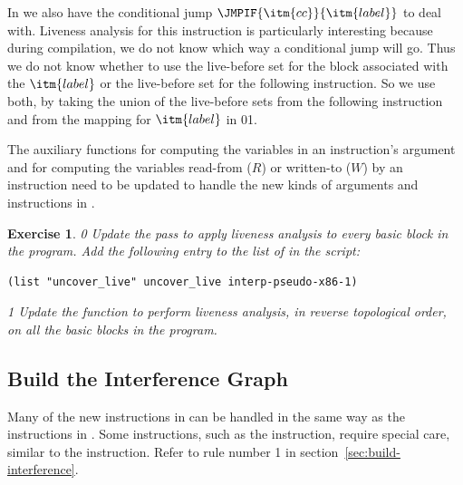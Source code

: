 \documentclass[7x10]{TimesAPriori_MIT}%
\def\racketEd{0}
\def\pythonEd{1}
\providecommand{\BookEdition}{1}
\let\edition\BookEdition
\newcommand{\racket}[1]{{\if\edition\racketEd{#1}\fi}}
\newcommand{\pythonColor}[0]{}
\newcommand{\python}[1]{{\if\edition\pythonEd\pythonColor #1\fi}}
\newtheorem{exercise}[theorem]{Exercise}
\numberwithin{theorem}{chapter}
\numberwithin{definition}{chapter}
\numberwithin{equation}{chapter}
\begin{document}
In \LangXIfVar{} we also have the conditional jump
$\JMPIF{\itm{cc}}{\itm{label}}$ to deal with.  Liveness analysis for
this instruction is particularly interesting because during
compilation, we do not know which way a conditional jump will go. Thus
we do not know whether to use the live-before set for the block
associated with the $\itm{label}$ or the live-before set for the
following instruction. So we use both, by taking the union of the
live-before sets from the following instruction and from the mapping
for $\itm{label}$ in
\racket{}\python{}.

The auxiliary functions for computing the variables in an
instruction's argument and for computing the variables read-from ($R$)
or written-to ($W$) by an instruction need to be updated to handle the
new kinds of arguments and instructions in \LangXIfVar{}.

\begin{exercise}\normalfont\normalsize
{\if\edition\racketEd
%
Update the  pass to apply liveness analysis to
every basic block in the program.
%
Add the following entry to the list of  in the
 script:
\begin{lstlisting}
(list "uncover_live" uncover_live interp-pseudo-x86-1)
\end{lstlisting}
\fi}

{\if\edition\pythonEd\pythonColor
%
Update the  function to perform liveness analysis,
in reverse topological order, on all the basic blocks in the
program.
%  
\fi}
\end{exercise}

\subsection{Build the Interference Graph}
\label{sec:build-interference-Lif}

Many of the new instructions in \LangXIfVar{} can be handled in the
same way as the instructions in \LangXVar{}.
%
Some instructions, such as the  instruction, require special care,
similar to the  instruction. Refer to rule number 1 in
section~\ref{sec:build-interference}.
\end{document}
